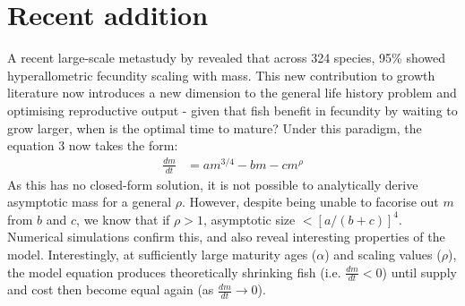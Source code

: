\documentclass[a4paper]{article} %
\begin{document}
\section{Recent addition}
A recent large-scale metastudy by \cite{Barneche2018d} revealed that across 324 species, 95\% showed hyperallometric fecundity scaling with mass. This new contribution to growth literature now introduces a new dimension to the general life history problem and optimising reproductive output - given that fish benefit in fecundity by waiting to grow larger, when is the optimal time to mature? Under this paradigm, the equation 3 now takes the form:
\begin{align}
    \frac{dm}{dt} &= am^{3/4} - bm - cm^{\rho}
\end{align}
As this has no closed-form solution, it is not possible to analytically derive asymptotic mass for a general $\rho$. However, despite being unable to facorise out $m$ from $b$ and $c$, we know that if $\rho > 1$, asymptotic size $< [a/(b+c)]^4$. Numerical simulations confirm this, and also reveal interesting properties of the model. Interestingly, at sufficiently large maturity ages ($\alpha$) and scaling values ($\rho$), the model equation produces theoretically shrinking fish (i.e. $\frac{dm}{dt} < 0$) until supply and cost then become equal again (as $\frac{dm}{dt} \rightarrow 0$). 
\end{document}
